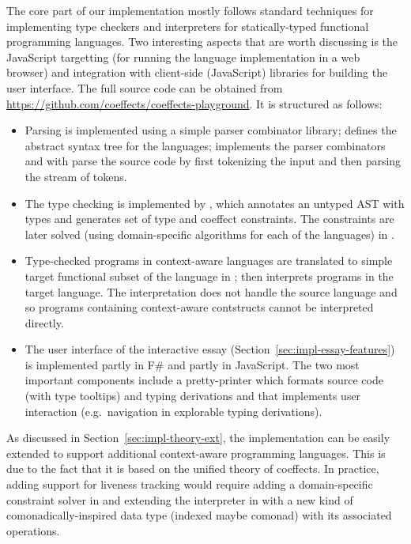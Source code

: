 The core part of our implementation mostly follows standard techniques for implementing type
checkers and interpreters for statically-typed functional programming languages. Two interesting
aspects that are worth discussing is the JavaScript targetting (for running the language
implementation in a web browser) and integration with client-side (JavaScript) libraries for
building the user interface. The full source code can be obtained from
\url{https://github.com/coeffects/coeffects-playground}. It is structured as follows:
%
\begin{itemize}
\item Parsing is implemented using a simple parser combinator library;  defines the
  abstract syntax tree for the languages;  implements the parser combinators
  and  with  parse the source code by first tokenizing
  the input and then parsing the stream of tokens.

\item The type checking is implemented by , which annotates an untyped AST
  with types and generates set of type and coeffect constraints. The constraints are later solved
  (using domain-specific algorithms for each of the languages) in .

\item Type-checked programs in context-aware languages are translated to simple target
  functional subset of the language in ;  then interprets
  programs in the target language. The interpretation does not handle the source
  language and so programs containing context-aware contstructs cannot be interpreted directly.

\item The user interface of the interactive essay (Section~\ref{sec:impl-essay-features})
  is implemented partly in F\# and partly in JavaScript. The two most important components include
  a pretty-printer  which formats source code (with type tooltips) and typing
  derivations and  that implements user interaction (e.g.~navigation in explorable
  typing derivations).
\end{itemize}

\noindent
As discussed in Section~\ref{sec:impl-theory-ext}, the implementation can be easily extended to
support additional context-aware programming languages. This is due to the fact that it is based
on the unified theory of coeffects. In practice, adding support for liveness tracking would
require adding a domain-specific constraint solver in  and extending the
interpreter in  with a new kind of comonadically-inspired data type
(indexed maybe comonad) with its associated operations.

